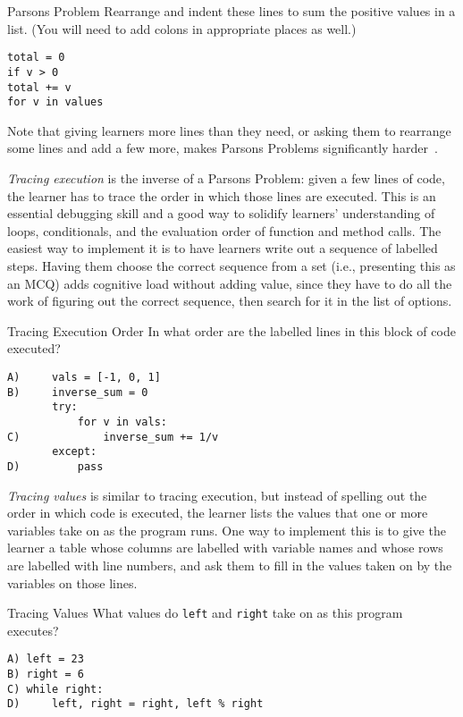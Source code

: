 \begin{aside}{Parsons Problem}
  Rearrange and indent these lines to sum the positive values in a list.
  (You will need to add colons in appropriate places as well.)

\begin{verbatim}
total = 0
if v > 0
total += v
for v in values
\end{verbatim}
\end{aside}

Note that giving learners more lines than they need,
or asking them to rearrange some lines and add a few more,
makes Parsons Problems significantly harder~\cite{Harm2016}.


\emph{Tracing execution} is the inverse of a Parsons Problem:
given a few lines of code,
the learner has to trace the order in which those lines are executed.
This is an essential debugging skill
and a good way to solidify learners' understanding of loops, conditionals,
and the evaluation order of function and method calls.
The easiest way to implement it is to have learners write out a sequence of labelled steps.
Having them choose the correct sequence from a set
(i.e., presenting this as an MCQ)
adds cognitive load without adding value,
since they have to do all the work of figuring out the correct sequence,
then search for it in the list of options.

\begin{aside}{Tracing Execution Order}
  In what order are the labelled lines in this block of code executed?

\begin{verbatim}
A)     vals = [-1, 0, 1]
B)     inverse_sum = 0
       try:
           for v in vals:
C)             inverse_sum += 1/v
       except:
D)         pass
\end{verbatim}
\end{aside}

\emph{Tracing values} is similar to tracing execution,
but instead of spelling out the order in which code is executed,
the learner lists the values that one or more variables take on
as the program runs.
One way to implement this is to give the learner a table
whose columns are labelled with variable names
and whose rows are labelled with line numbers,
and ask them to fill in the values taken on by the variables on those lines.

\newpage
\begin{aside}{Tracing Values}
  What values do \texttt{left} and \texttt{right} take on as this program executes?

\begin{verbatim}
A) left = 23
B) right = 6
C) while right:
D)     left, right = right, left % right
\end{verbatim}
\end{aside}


